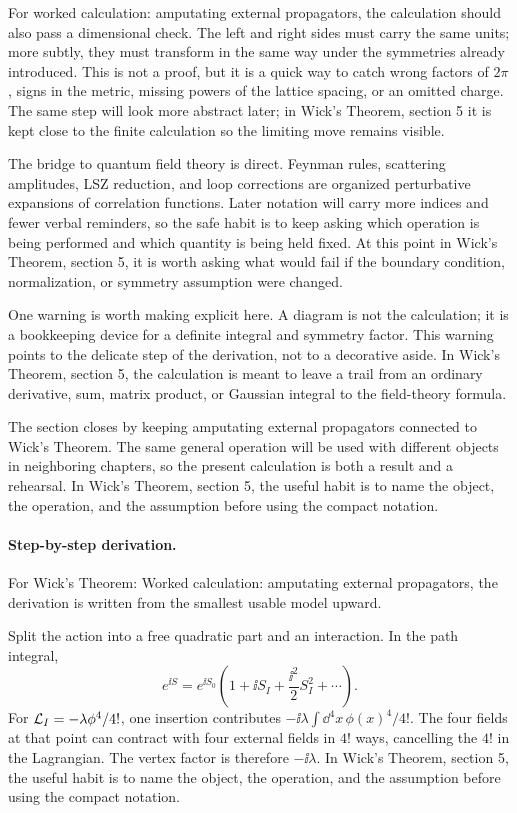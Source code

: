 For worked calculation: amputating external propagators, the calculation should also pass a dimensional check.  The left and right sides must carry the same units; more subtly, they must transform in the same way under the symmetries already introduced.  This is not a proof, but it is a quick way to catch wrong factors of \(2\pi\), signs in the metric, missing powers of the lattice spacing, or an omitted charge.  The same step will look more abstract later; in Wick's Theorem, section 5 it is kept close to the finite calculation so the limiting move remains visible.

The bridge to quantum field theory is direct.  Feynman rules, scattering amplitudes, LSZ reduction, and loop corrections are organized perturbative expansions of correlation functions.  Later notation will carry more indices and fewer verbal reminders, so the safe habit is to keep asking which operation is being performed and which quantity is being held fixed.  At this point in Wick's Theorem, section 5, it is worth asking what would fail if the boundary condition, normalization, or symmetry assumption were changed.

One warning is worth making explicit here.  A diagram is not the calculation; it is a bookkeeping device for a definite integral and symmetry factor.  This warning points to the delicate step of the derivation, not to a decorative aside.  In Wick's Theorem, section 5, the calculation is meant to leave a trail from an ordinary derivative, sum, matrix product, or Gaussian integral to the field-theory formula.

The section closes by keeping amputating external propagators connected to Wick's Theorem.  The same general operation will be used with different objects in neighboring chapters, so the present calculation is both a result and a rehearsal.  In Wick's Theorem, section 5, the useful habit is to name the object, the operation, and the assumption before using the compact notation.



\paragraph{Step-by-step derivation.}

For Wick's Theorem: Worked calculation: amputating external propagators, the derivation is written from the smallest usable model upward.

Split the action into a free quadratic part and an interaction.  In the path integral,
\[
  e^{\ii S}=e^{\ii S_0}\left(1+\ii S_I+\frac{\ii^2}{2}S_I^2+\cdots\right).
\]
For \(\mathcal L_I=-\lambda\phi^4/4!\), one insertion contributes \(-\ii\lambda\int\dd^4x\,\phi(x)^4/4!\).  The four fields at that point can contract with four external fields in \(4!\) ways, cancelling the \(4!\) in the Lagrangian.  The vertex factor is therefore \(-\ii\lambda\).  In Wick's Theorem, section 5, the useful habit is to name the object, the operation, and the assumption before using the compact notation.

